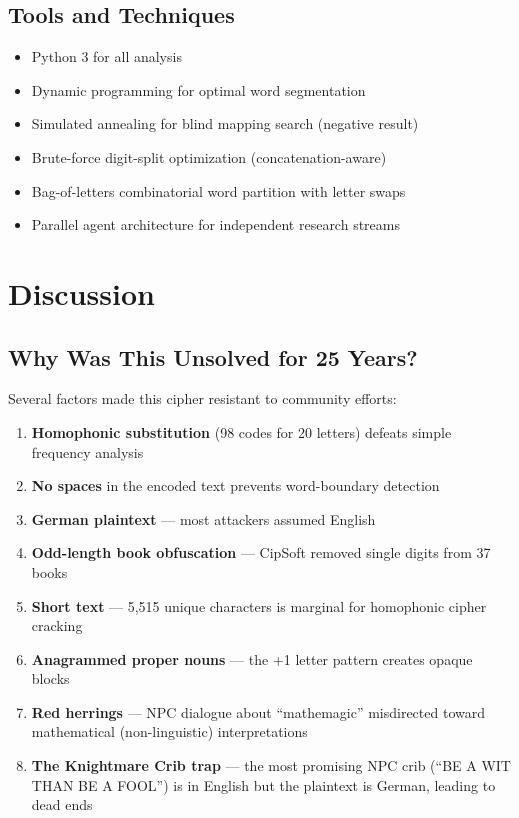 \documentclass[11pt,a4paper]{article}
\begin{document}
\subsection{Tools and Techniques}

\begin{itemize}
\item Python 3 for all analysis
\item Dynamic programming for optimal word segmentation
\item Simulated annealing for blind mapping search (negative result)
\item Brute-force digit-split optimization (concatenation-aware)
\item Bag-of-letters combinatorial word partition with letter swaps
\item Parallel agent architecture for independent research streams
\end{itemize}

\section{Discussion}

\subsection{Why Was This Unsolved for 25 Years?}

Several factors made this cipher resistant to community efforts:

\begin{enumerate}
\item \textbf{Homophonic substitution} (98 codes for 20 letters) defeats simple frequency analysis
\item \textbf{No spaces} in the encoded text prevents word-boundary detection
\item \textbf{German plaintext} --- most attackers assumed English
\item \textbf{Odd-length book obfuscation} --- CipSoft removed single digits from 37 books
\item \textbf{Short text} --- 5,515 unique characters is marginal for homophonic cipher cracking
\item \textbf{Anagrammed proper nouns} --- the +1 letter pattern creates opaque blocks
\item \textbf{Red herrings} --- NPC dialogue about ``mathemagic'' misdirected toward mathematical (non-linguistic) interpretations
\item \textbf{The Knightmare Crib trap} --- the most promising NPC crib (``BE A WIT THAN BE A FOOL'') is in English but the plaintext is German, leading to dead ends
\end{enumerate}
\end{document}

